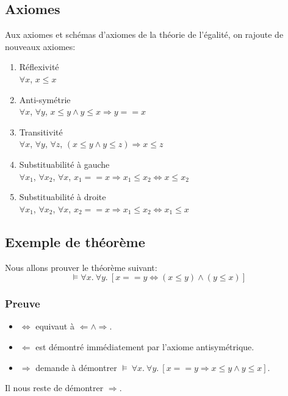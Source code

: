 {\subsection{Axiomes} 

Aux axiomes et schémas d'axiomes de la théorie de l'égalité, on rajoute de nouveaux axiomes:
\begin{enumerate}
\item Réflexivité \\$\forall x$, $x\leq x$
\item Anti-symétrie \\$\forall x$, $\forall y$, $ x\leq y \land y\leq x\Rightarrow y==x$
\item Transitivité \\$\forall x$, $\forall y$, $\forall z$, $(x\leq y \land y\leq z) \Rightarrow x\leq z$
\item Substituabilité à gauche \\$\forall x_{1}$, $\forall x_{2}$, $\forall x$,  $x_{1}==x \Rightarrow x_{1}\leq x_{2} \Leftrightarrow x \leq x_{2}$
\item Substituabilité à droite \\$\forall x_{1}$, $\forall x_{2}$, $\forall x$,  $x_{2}==x \Rightarrow x_{1}\leq x_{2} \Leftrightarrow x_{1} \leq x$
\end{enumerate}

\subsection{Exemple de théorème}

Nous allons prouver le théorème suivant:
$$\models \forall x.\ \forall y.\  [x==y \Leftrightarrow (x\leq y)\land (y \leq x)] $$

\subsubsection{Preuve}

\begin{itemize}
\item $\Leftrightarrow$ equivaut à $\Leftarrow \land \Rightarrow$.
\item $\Leftarrow$ est démontré immédiatement par l'axiome antisymétrique.
\item $\Rightarrow$ demande à démontrer $\models{}\ \forall x.\ \forall y.\ [x==y \Rightarrow x\leq y \land y \leq x]$.
\end{itemize}
Il nous reste de démontrer $\Rightarrow$.

}
